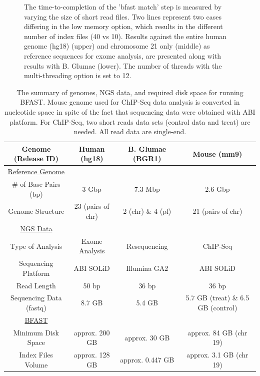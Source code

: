 \documentclass{cpeauth}
\begin{document}
\begin{figure}
\caption{\small The time-to-completion of the 'bfast match' step is
  measured by varying the size of short read files.  Two lines
  represent two cases differing in the low memory option, which
  results in the different number of index files (40 vs 10).  Results
  against the entire human genome (hg18) (upper) and chromosome 21
  only (middle) as reference sequences for exome analysis, are
  presented along with results with B. Glumae (lower).  The number of
  threads with the multi-threading option is set to 12.  }
  \label{fig:parallel-execution} 
 \end{figure}




\begin{table}
\small
\begin{tabular}{|c|c|c|c|} 
  \hline 
Genome (Release ID)   & Human (hg18) & B. Glumae (BGR1) & Mouse (mm9)  \\    
   
\hline \hline
\underline{Reference Genome} & & & \\
    \# of Base Pairs (bp) &  3 Gbp & 7.3 Mbp & 2.6 Gbp\\ 
   Genome Structure &   23 (pairs of chr)  & 2 (chr) \& 4 (pl) & 21 (pairs of chr)   \\   
 
      \hline \hline
  \underline{NGS Data} & &   & \\
      Type of  Analysis &  Exome Analysis &  Resequencing & ChIP-Seq\\ 
  
          Sequencing Platform & ABI SOLiD  &  Illumina GA2 & ABI SOLiD \\ 
          Read Length & 50 bp & 36 bp & 36 bp \\

  Sequencing Data (fastq)  & 8.7 GB & 5.4 GB & 5.7 GB (treat) \& 6.5 GB (control) \\
  
  
  \hline  \hline
  \underline{BFAST} & &  & \\
  Minimum Disk Space &  approx. 200 GB   &    approx. 30 GB  &  approx. 84 GB (chr 19)\\
   Index Files Volume  & approx. 128 GB  & approx. 0.447 GB  & approx. 3.1 GB (chr 19)\\ 
\hline  \hline
\end{tabular} \caption{The summary of genomes, NGS data, and required disk space for running BFAST.  Mouse genome used for ChIP-Seq data analysis is converted in nucleotide space in spite of the fact that sequencing data were obtained with ABI platform.  For ChIP-Seq, two short reads data sets (control data and treat) are needed.  All read data are single-end.}
 \label{table:two-genomes} 
\end{table}
\end{document}
